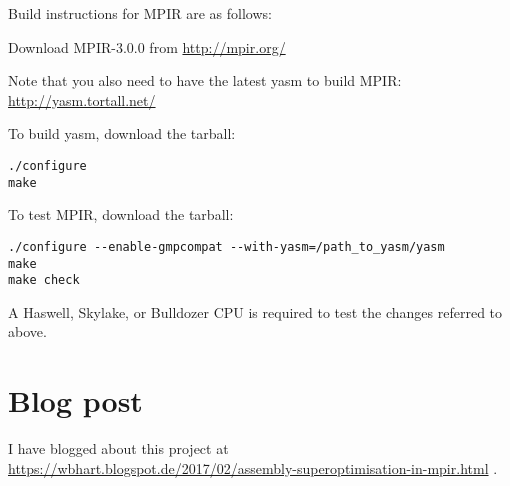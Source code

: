 Build instructions for MPIR are as follows:

Download MPIR-3.0.0 from \url{http://mpir.org/}

Note that you also need to have the latest yasm to build MPIR:
\url{http://yasm.tortall.net/}

To build yasm, download the tarball:

\begin{verbatim}
./configure
make
\end{verbatim}

To test MPIR, download the tarball:

\begin{verbatim}
./configure --enable-gmpcompat --with-yasm=/path_to_yasm/yasm
make
make check
\end{verbatim}

A Haswell, Skylake, or Bulldozer CPU is required to test the changes
referred to above.

\section{Blog post}\label{blog-post}

I have blogged about this project at
\url{https://wbhart.blogspot.de/2017/02/assembly-superoptimisation-in-mpir.html}
.
